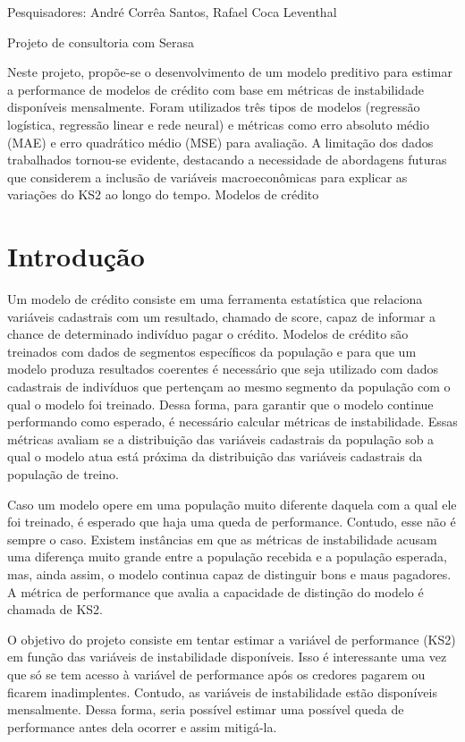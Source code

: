     {
        \noindent Pesquisadores: André Corrêa Santos, Rafael Coca Leventhal

        \noindent Projeto de consultoria com Serasa
    }
    {Neste projeto, propõe-se o desenvolvimento de um modelo preditivo para estimar a performance de modelos de crédito com base em métricas de instabilidade disponíveis mensalmente. Foram utilizados três tipos de modelos (regressão logística, regressão linear e rede neural) e métricas como erro absoluto médio (MAE) e erro quadrático médio (MSE) para avaliação. A limitação dos dados trabalhados tornou-se evidente, destacando a necessidade de abordagens futuras que considerem a inclusão de variáveis macroeconômicas para explicar as variações do KS2 ao longo do tempo.}
    {Modelos de crédito}

\section{Introdução}
Um modelo de crédito consiste em uma ferramenta estatística que relaciona variáveis cadastrais com um resultado, chamado de score, capaz de informar a chance de determinado indivíduo pagar o crédito.
Modelos de crédito são treinados com dados de segmentos específicos da população e para que um modelo produza resultados coerentes é necessário que seja utilizado com dados cadastrais de indivíduos que pertençam ao mesmo segmento da população com o qual o modelo foi treinado. Dessa forma, para garantir que o modelo continue performando como esperado, é necessário calcular métricas de instabilidade. Essas métricas avaliam se a distribuição das variáveis cadastrais da população sob a qual o modelo atua está próxima da distribuição das variáveis cadastrais da população de treino.

Caso um modelo opere em uma população muito diferente daquela com a qual ele foi treinado, é esperado que haja uma queda de performance. Contudo, esse não é sempre o caso. Existem instâncias em que as métricas de instabilidade acusam uma diferença muito grande entre a população recebida e a população esperada, mas, ainda assim, o modelo continua capaz de distinguir bons e maus pagadores. A métrica de performance que avalia a capacidade de distinção do modelo é chamada de KS2.

O objetivo do projeto consiste em tentar estimar a variável de performance (KS2) em função das variáveis de instabilidade disponíveis. Isso é interessante uma vez que só se tem acesso à variável de performance após os credores pagarem ou ficarem inadimplentes. Contudo, as variáveis de instabilidade estão disponíveis mensalmente. Dessa forma, seria possível estimar uma possível queda de performance antes dela ocorrer e assim mitigá-la.

